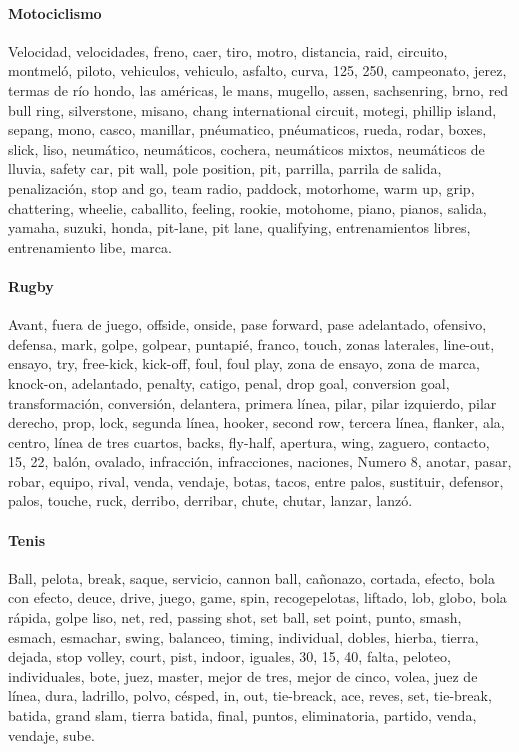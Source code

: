 \documentclass[../all.tex]{subfiles}
\begin{document}
    \paragraph{Motociclismo}
    Velocidad, velocidades, freno, caer, tiro, motro, distancia, raid, circuito, montmeló, piloto, vehiculos, vehiculo, asfalto, curva, 125, 250, campeonato, jerez, termas de río hondo, las américas, le mans, mugello, assen, sachsenring, brno, red bull ring, silverstone, misano, chang international circuit, motegi, phillip island, sepang, mono, casco, manillar, pnéumatico, pnéumaticos, rueda, rodar, boxes, slick, liso, neumático, neumáticos, cochera, neumáticos mixtos, neumáticos de lluvia, safety car, pit wall, pole position, pit, parrilla, parrila de salida, penalización, stop and go, team radio, paddock, motorhome, warm up, grip, chattering, wheelie, caballito, feeling, rookie, motohome, piano, pianos, salida, yamaha, suzuki, honda, pit-lane, pit lane, qualifying, entrenamientos libres, entrenamiento libe, marca.
    \paragraph{Rugby}
    Avant, fuera de juego, offside, onside, pase forward, pase adelantado, ofensivo, defensa, mark, golpe, golpear, puntapié, franco, touch, zonas laterales, line-out, ensayo, try, free-kick, kick-off, foul, foul play, zona de ensayo, zona de marca, knock-on, adelantado, penalty, catigo, penal, drop goal, conversion goal, transformación, conversión, delantera, primera línea, pilar, pilar izquierdo, pilar derecho, prop, lock, segunda línea, hooker, second row, tercera línea, flanker, ala, centro, línea de tres cuartos, backs, fly-half, apertura, wing, zaguero, contacto, 15, 22, balón, ovalado, infracción, infracciones, naciones, Numero 8, anotar, pasar, robar, equipo, rival, venda, vendaje, botas, tacos, entre palos, sustituir, defensor, palos, touche, ruck, derribo, derribar, chute, chutar, lanzar, lanzó.
    \paragraph{Tenis}
    Ball, pelota, break, saque, servicio, cannon ball, cañonazo, cortada, efecto, bola con efecto, deuce, drive, juego, game, spin, recogepelotas, liftado, lob, globo, bola rápida, golpe liso, net, red, passing shot, set ball, set point, punto, smash, esmach, esmachar, swing, balanceo, timing, individual, dobles, hierba, tierra, dejada, stop volley, court, pist, indoor, iguales, 30, 15, 40, falta, peloteo, individuales, bote, juez, master, mejor de tres, mejor de cinco, volea, juez de línea, dura, ladrillo, polvo, césped, in, out, tie-breack, ace, reves, set, tie-break, batida, grand slam, tierra batida, final, puntos, eliminatoria, partido, venda, vendaje, sube.
\end{document}
